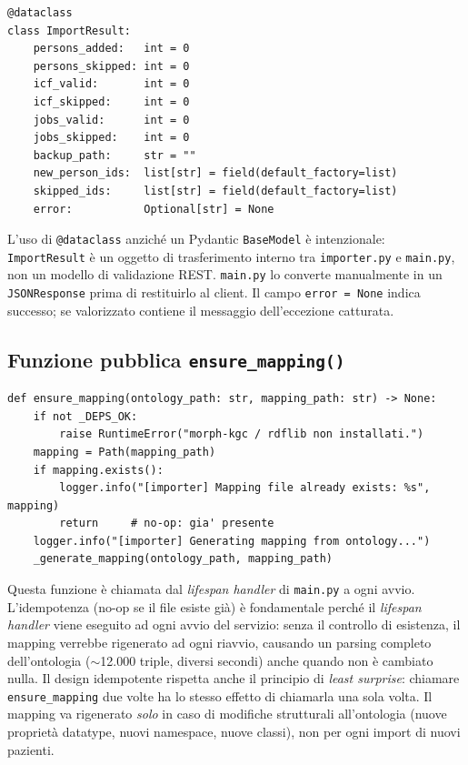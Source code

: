 \documentclass[a4paper,12pt]{article}
\begin{document}
\begin{lstlisting}[caption={\texttt{ImportResult} --- struttura dati di ritorno.}]
@dataclass
class ImportResult:
    persons_added:   int = 0
    persons_skipped: int = 0
    icf_valid:       int = 0
    icf_skipped:     int = 0
    jobs_valid:      int = 0
    jobs_skipped:    int = 0
    backup_path:     str = ""
    new_person_ids:  list[str] = field(default_factory=list)
    skipped_ids:     list[str] = field(default_factory=list)
    error:           Optional[str] = None
\end{lstlisting}

\noindent L'uso di \texttt{@dataclass} anzich\'{e} un Pydantic \texttt{BaseModel}
\`{e} intenzionale: \texttt{ImportResult} \`{e} un oggetto di trasferimento
interno tra \texttt{importer.py} e \texttt{main.py}, non un modello di
validazione REST. \texttt{main.py} lo converte manualmente in un
\texttt{JSONResponse} prima di restituirlo al client. Il campo
\texttt{error = None} indica successo; se valorizzato contiene il
messaggio dell'eccezione catturata.

\subsection{Funzione pubblica \texttt{ensure\_mapping()}}

\begin{lstlisting}[caption={\texttt{ensure\_mapping()} --- generazione idempotente del mapping.}]
def ensure_mapping(ontology_path: str, mapping_path: str) -> None:
    if not _DEPS_OK:
        raise RuntimeError("morph-kgc / rdflib non installati.")
    mapping = Path(mapping_path)
    if mapping.exists():
        logger.info("[importer] Mapping file already exists: %s", mapping)
        return     # no-op: gia' presente
    logger.info("[importer] Generating mapping from ontology...")
    _generate_mapping(ontology_path, mapping_path)
\end{lstlisting}

\noindent Questa funzione \`{e} chiamata dal \textit{lifespan handler} di
\texttt{main.py} a ogni avvio. L'idempotenza (no-op se il file esiste gi\`{a}) \`{e} fondamentale
perch\'{e} il \textit{lifespan handler} viene eseguito ad ogni avvio
del servizio: senza il controllo di esistenza, il mapping verrebbe
rigenerato ad ogni riavvio, causando un parsing completo dell'ontologia
($\sim$12.000 triple, diversi secondi) anche quando non \`{e} cambiato
nulla. Il design idempotente rispetta anche il principio di \textit{least
surprise}: chiamare \texttt{ensure\_mapping} due volte ha lo stesso
effetto di chiamarla una sola volta.
Il mapping va rigenerato \textit{solo} in caso di modifiche strutturali
all'ontologia (nuove propriet\`{a} datatype, nuovi namespace, nuove classi),
non per ogni import di nuovi pazienti.
\end{document}
